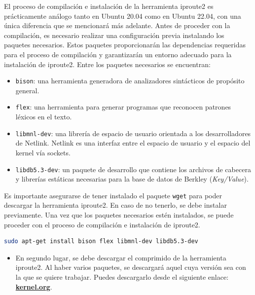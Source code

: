 El proceso de compilación e instalación de la herramienta iproute2 es prácticamente análogo tanto en Ubuntu 20.04 como en Ubuntu 22.04, con una única diferencia que se mencionará más adelante. Antes de proceder con la compilación, es necesario realizar una configuración previa instalando los paquetes necesarios. Estos paquetes proporcionarán las dependencias requeridas para el proceso de compilación y garantizarán un entorno adecuado para la instalación de iproute2. Entre los paquetes necesarios se encuentran:

\begin{itemize}
    \item \texttt{bison}: una herramienta generadora de analizadores sintácticos de propósito general.
    \item \texttt{flex}: una herramienta para generar programas que reconocen patrones léxicos en el texto.
    \item \texttt{libmnl-dev}: una librería de espacio de usuario orientada a los desarrolladores de Netlink. Netlink es una interfaz entre el espacio de usuario y el espacio del kernel vía sockets.

    \item \texttt{libdb5.3-dev}: un paquete de desarrollo que contiene los archivos de cabecera y librerías estáticas necesarias para la base de datos de Berkley (\textit{Key/Value}).
\end{itemize}

Es importante asegurarse de tener instalado el paquete \texttt{wget} para poder descargar la herramienta iproute2. En caso de no tenerlo, se debe instalar previamente. Una vez que los paquetes necesarios estén instalados, se puede proceder con el proceso de compilación e instalación de iproute2.\\


\begin{lstlisting}[language= bash, style=Consola2, caption={Instalación de las dependencias de Iproute2},label=code:iproute2_deps]
   sudo apt-get install bison flex libmnl-dev libdb5.3-dev
\end{lstlisting}

\begin{itemize}
    \item En segundo lugar, se debe descargar el comprimido de la herramienta iproute2. Al haber varios paquetes, se descargará aquel cuya versión sea con la que se quiere trabajar. Puedes descargarlo desde el siguiente enlace: \href{https://mirrors.edge.kernel.org/pub/linux/utils/net/iproute2/}{\textbf{kernel.org}}.
\end{itemize}

